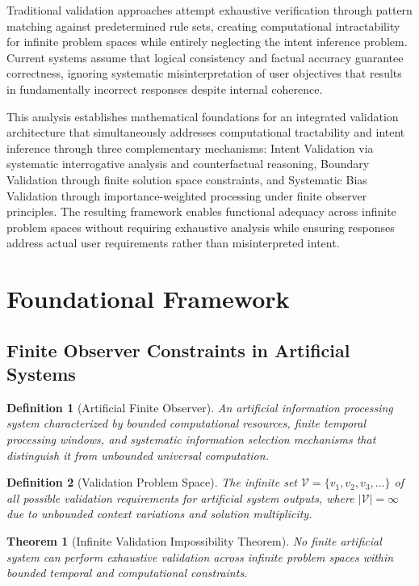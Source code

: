\documentclass[12pt,a4paper]{article}
\newtheorem{theorem}{Theorem}
\newtheorem{definition}{Definition}
\begin{document}
Traditional validation approaches attempt exhaustive verification through pattern matching against predetermined rule sets, creating computational intractability for infinite problem spaces while entirely neglecting the intent inference problem. Current systems assume that logical consistency and factual accuracy guarantee correctness, ignoring systematic misinterpretation of user objectives that results in fundamentally incorrect responses despite internal coherence.

This analysis establishes mathematical foundations for an integrated validation architecture that simultaneously addresses computational tractability and intent inference through three complementary mechanisms: Intent Validation via systematic interrogative analysis and counterfactual reasoning, Boundary Validation through finite solution space constraints, and Systematic Bias Validation through importance-weighted processing under finite observer principles. The resulting framework enables functional adequacy across infinite problem spaces without requiring exhaustive analysis while ensuring responses address actual user requirements rather than misinterpreted intent.

\section{Foundational Framework}

\subsection{Finite Observer Constraints in Artificial Systems}

\begin{definition}[Artificial Finite Observer]
An artificial information processing system characterized by bounded computational resources, finite temporal processing windows, and systematic information selection mechanisms that distinguish it from unbounded universal computation.
\end{definition}

\begin{definition}[Validation Problem Space]
The infinite set $\mathcal{V} = \{v_1, v_2, v_3, ...\}$ of all possible validation requirements for artificial system outputs, where $|\mathcal{V}| = \infty$ due to unbounded context variations and solution multiplicity.
\end{definition}

\begin{theorem}[Infinite Validation Impossibility Theorem]
No finite artificial system can perform exhaustive validation across infinite problem spaces within bounded temporal and computational constraints.
\end{theorem}
\end{document}
